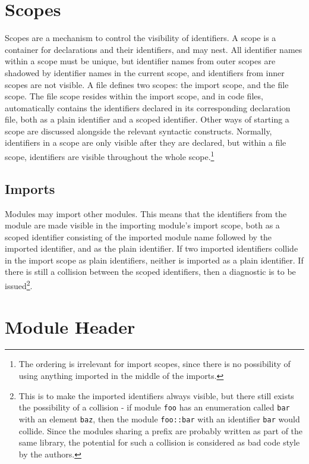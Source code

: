 \documentclass[letterpaper,12pt]{book}
\begin{document}
\section{Scopes}

Scopes are a mechanism to control the visibility of identifiers. A scope is a container for declarations and their identifiers, and may nest. All identifier names within a scope must be unique, but identifier names from outer scopes are shadowed by identifier names in the current scope, and identifiers from inner scopes are not visible. A file defines two scopes: the import scope, and the file scope. The file scope resides within the import scope, and in code files, automatically contains the identifiers declared in its corresponding declaration file, both as a plain identifier and a scoped identifier. Other ways of starting a scope are discussed alongside the relevant syntactic constructs. Normally, identifiers in a scope are only visible after they are declared, but within a file scope, identifiers are visible throughout the whole scope.\footnote{The ordering is irrelevant for import scopes, since there is no possibility of using anything imported in the middle of the imports.}

\subsection{Imports}

Modules may import other modules. This means that the identifiers from the module are made visible in the importing module's import scope, both as a scoped identifier consisting of the imported module name followed by the imported identifier, and as the plain identifier. If two imported identifiers collide in the import scope as plain identifiers, neither is imported as a plain identifier. If there is still a collision between the scoped identifiers, then a diagnostic is to be issued\footnote{This is to make the imported identifiers always visible, but there still exists the possibility of a collision - if module \texttt{foo} has an enumeration called \texttt{bar} with an element \texttt{baz}, then the module \texttt{foo::bar} with an identifier \texttt{bar} would collide. Since the modules sharing a prefix are probably written as part of the same library, the potential for such a collision is considered as bad code style by the authors.}.

\section{Module Header}
\end{document}
